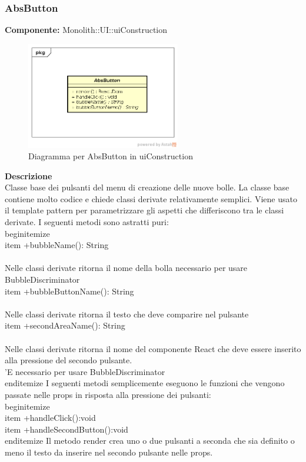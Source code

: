 \subsubsection{AbsButton}
\textbf{Componente:}  Monolith::UI::uiConstruction\\
   \FloatBarrier
   \begin{figure}[ht]
   \centering
   \includegraphics[width=0.6\textwidth]{img/single-AbsButton}
   \caption{{Diagramma per AbsButton in uiConstruction}}
\end{figure}
\FloatBarrier
\textbf{Descrizione}\\
Classe base dei pulsanti del menu di creazione delle nuove bolle. La classe base contiene molto codice e chiede classi derivate relativamente semplici. Viene usato il template pattern per parametrizzare gli aspetti che differiscono tra le classi derivate.
I seguenti metodi sono astratti puri:
\\begin{itemize}
\\item +bubbleName(): String \\\\
Nelle classi derivate ritorna il nome della bolla necessario per usare BubbleDiscriminator
\\item +bubbleButtonName(): String \\\\
Nelle classi derivate ritorna il testo che deve comparire nel pulsante
\\item +secondAreaName(): String \\\\
Nelle classi derivate ritorna il nome del componente React che deve essere inserito alla pressione del secondo pulsante. \\'E necessario per usare BubbleDiscriminator
\\end{itemize}
I seguenti metodi semplicemente eseguono le funzioni che vengono passate nelle props in risposta alla pressione dei pulsanti:
\\begin{itemize}
\\item +handleClick():void
\\item +handleSecondButton():void
\\end{itemize}
Il metodo render crea uno o due pulsanti a seconda che sia definito o meno il testo da inserire nel secondo pulsante nelle props. 


